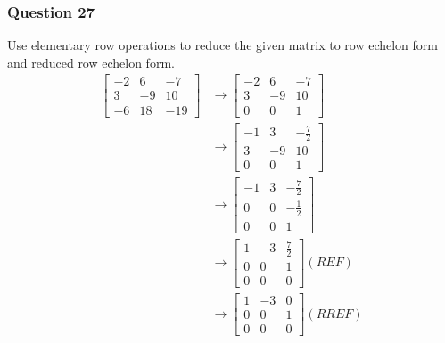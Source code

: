 \documentclass{math}
\begin{document}
\subsubsection*{Question 27}
Use elementary row operations to reduce the given matrix to row echelon form
and reduced row echelon form.
\begin{align*}
  \begin{bmatrix}
    -2 & 6 & -7 \\
    3 & -9 & 10 \\
    -6 & 18 & -19
  \end{bmatrix} &\to \begin{bmatrix}
    -2 & 6 & -7 \\
    3 & -9 & 10 \\
    0 & 0 & 1
  \end{bmatrix} \\
  &\to \begin{bmatrix}
    -1 & 3 & -\frac{7}{2} \\
    3 & -9 & 10 \\
    0 & 0 & 1
  \end{bmatrix} \\
  &\to \begin{bmatrix}
    -1 & 3 & -\frac{7}{2} \\
    0 & 0 & -\frac{1}{2} \\
    0 & 0 & 1
  \end{bmatrix} \\
  &\to \begin{bmatrix}
    1 & -3 & \frac{7}{2} \\
    0 & 0 & 1 \\
    0 & 0 & 0
  \end{bmatrix} (REF) \\
  &\to \begin{bmatrix}
    1 & -3 & 0 \\
    0 & 0 & 1 \\
    0 & 0 & 0
  \end{bmatrix} (RREF)
\end{align*}
\end{document}
